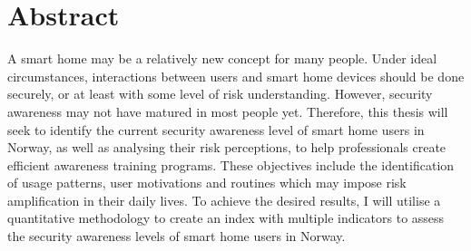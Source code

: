 \chapter*{Abstract}
A smart home may be a relatively new concept for many people. Under ideal circumstances, interactions between users and smart home devices should be done securely, or at least with some level of risk understanding. However, security awareness may not have matured in most people yet. Therefore, this thesis will seek to identify the current security awareness level of smart home users in Norway, as well as analysing their risk perceptions, to help professionals create efficient awareness training programs. These objectives include the identification of usage patterns, user motivations and routines which may impose risk amplification in their daily lives. To achieve the desired results, I will utilise a quantitative methodology to create an index with multiple indicators to assess the security awareness levels of smart home users in Norway.

\begin{comment}
The \texttt{ntnuthesis} document class is a customised version of the standard \LaTeX{} \texttt{report} document class. It can be used for theses at all levels – bachelor, master and PhD – and is available in English (British and American) and Norwegian (Bokmål and Nynorsk). This document is ment to serve (i) as a description of the document class, (ii) as an example of how to use it, and (iii) as a thesis template.
\end{comment}
